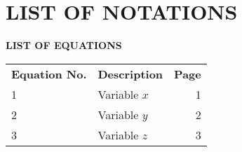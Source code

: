 \chapter*{LIST OF NOTATIONS}
\begin{center}
{\bf LIST OF EQUATIONS}\\[36pt]
\end{center}
{\baselineskip
\begin{tabular}{l l r}
	\hspace{0.25in}\textbf{Equation No.} & \hspace{0.5in}\textbf{Description} & \hspace{2.25in}\textbf{Page} \\[18pt]
	\hspace{0.75in}1 & \hspace{0.5in}Variable $x$ & 1 \\[12pt]
	\hspace{0.75in}2 & \hspace{0.5in}Variable $y$ & 2 \\[12pt]
	\hspace{0.75in}3 & \hspace{0.5in}Variable $z$ & 3 \\[12pt]
\end{tabular}
}